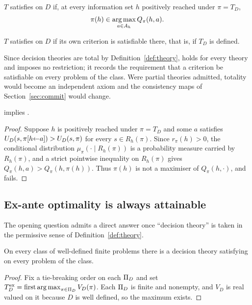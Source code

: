 \begin{definition}
$T$ satisfies  on $D$ if, at every information set $h$ positively reached under $\pi=T_D$,
\[
  \pi(h)\in\operatorname*{arg\,max}_{a\in A_h}Q_\pi(h,a).
\]
\end{definition}

\begin{definition}
$T$ satisfies  on $D$ if its own criterion is satisfiable there, that is, if $T_D$ is defined.
\end{definition}

Since decision theories are total by Definition~\ref{def:theory},  holds for every theory
and imposes no restriction; it records the requirement that a criterion be satisfiable on every
problem of the class. Were partial theories admitted, totality would become an independent axiom
and the consistency maps of Section~\ref{sec:commit} would change.

\begin{proposition}\label{prop:c3c2}
 implies .
\end{proposition}

\begin{proof}
Suppose $h$ is positively reached under $\pi=T_D$ and some $a$ satisfies
$U_D(s,\pi[h{\leftarrow}a])>U_D(s,\pi)$ for every $s\in R_h(\pi)$. Since $r_\pi(h)>0$, the conditional
distribution $\mu_\pi(\cdot\mid R_h(\pi))$ is a probability measure carried by $R_h(\pi)$, and a strict
pointwise inequality on $R_h(\pi)$ gives $Q_\pi(h,a)>Q_\pi(h,\pi(h))$. Thus $\pi(h)$ is not a maximiser
of $Q_\pi(h,\cdot)$, and  fails.
\end{proof}

\subsection{Ex-ante optimality is always attainable}

The opening question admits a direct answer once \enquote{decision theory} is taken in the
permissive sense of Definition~\ref{def:theory}.

\begin{theorem}\label{thm:universal}
On every class of well-defined finite problems there is a decision theory satisfying  on
every problem of the class.
\end{theorem}

\begin{proof}
Fix a tie-breaking order on each $\Pi_D$ and set
$T^{\mathrm{ex}}_D=\operatorname{first}\operatorname*{arg\,max}_{\pi\in\Pi_D}V_D(\pi)$. Each $\Pi_D$ is finite and nonempty, and
$V_D$ is real valued on it because $D$ is well defined, so the maximum exists.
\end{proof}

